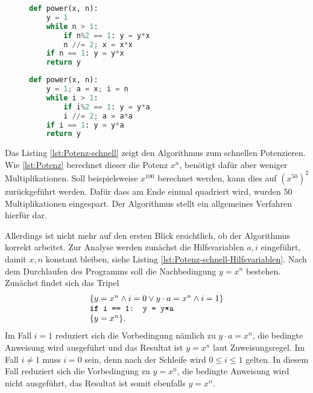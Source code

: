 \begin{figure}
\begin{center}
\begin{minipage}[t]{.48\textwidth}
\begin{lstlisting}[language=Python,caption={Schnelles Potenzieren},%
label=lst:Potenz-schnell]
def power(x, n):
    y = 1
    while n > 1:
        if n%2 == 1: y = y*x
        n //= 2; x = x*x
    if n == 1: y = y*x
    return y
\end{lstlisting}
\end{minipage}
\begin{minipage}[t]{.48\textwidth}
\begin{lstlisting}[language=Python,caption={Mit Hilfsvariablen},%
label=lst:Potenz-schnell-Hilfsvariablen]
def power(x, n):
    y = 1; a = x; i = n
    while i > 1:
        if i%2 == 1: y = y*a
        i //= 2; a = a*a
    if i == 1: y = y*a
    return y
\end{lstlisting}
\end{minipage}
\end{center}
\end{figure}

\noindent{}
Das Listing \ref{lst:Potenz-schnell} zeigt den Algorithmus zum schnellen
Potenzieren. Wie \ref{lst:Potenz} berechnet dieser die Potenz $x^n$,
benötigt dafür aber weniger Multiplikationen. Soll beispielsweise $x^{100}$
berechnet werden, kann dies auf $(x^{50})^2$ zurückgeführt werden. Dafür
dass am Ende einmal quadriert wird, wurden $50$ Multiplikationen
eingespart. Der Algorithmus stellt ein allgemeines Verfahren hierfür
dar.

Allerdings ist nicht mehr auf den ersten Blick ersichtlich, ob der
Algorithmus korrekt arbeitet. Zur Analyse werden zunächst die
Hilfsvariablen $a,i$ eingeführt, damit $x,n$ konstant bleiben, siehe
Listing \ref{lst:Potenz-schnell-Hilfsvariablen}. Nach dem Durchlaufen
des Programms soll die Nachbedingung $y=x^n$ bestehen. Zunächst findet
sich das Tripel
\[\begin{array}{l}
\{y = x^n\land i = 0 \lor y\cdot a = x^n\land i = 1\}\\
\text{\texttt{\textbf{if} i == 1: y = y*a}}\\
\{y = x^n\}.
\end{array}\]
Im Fall $i=1$ reduziert sich die Vorbedingung nämlich zu $y\cdot a=x^n$,
die bedingte Anweisung wird ausgeführt und das Resultat ist $y=x^n$ laut
Zuweisungsregel. Im Fall $i\ne 1$ muss $i=0$ sein, denn nach der
Schleife wird $0\le i\le 1$ gelten. In diesem Fall reduziert sich die
Vorbedingung zu $y=x^n$, die bedingte Anweisung wird nicht ausgeführt,
das Resultat ist somit ebenfalls $y=x^n$.

